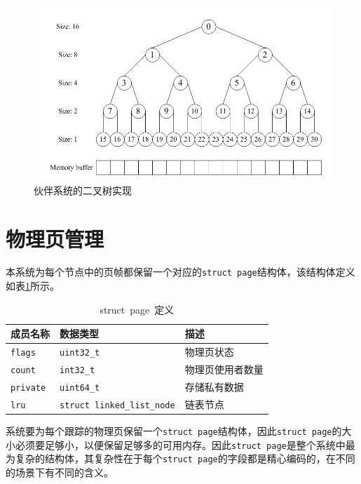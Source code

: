 \documentclass[AutoFakeBold]{LZUThesis}
\begin{document}
\begin{sloppypar}
\begin{figure}[htb]
\centering
\includegraphics[width=400pt]{images/buddy-system-binary-tree-implementation.jpg}
\caption{伙伴系统的二叉树实现}
\label{figure:buddy-system-binary-tree-implementation}
\end{figure}


\section{物理页管理}

本系统为每个节点中的页帧都保留一个对应的\texttt{struct\ page}结构体，该结构体定义如表\ref{table:struct-page-definition}所示。

\begin{longtable}[htb]{@{}lll@{}}
\caption{struct\ page\ 定义}\label{table:struct-page-definition} \\
\toprule\noalign{}
成员名称 & 数据类型 & 描述 \\
\midrule\noalign{}
\endhead
\bottomrule\noalign{}
\endlastfoot
\texttt{flags} & \texttt{uint32\_t} & 物理页状态 \\
\texttt{count} & \texttt{int32\_t} & 物理页使用者数量 \\
\texttt{private} & \texttt{uint64\_t} & 存储私有数据 \\
\texttt{lru} & \texttt{struct\ linked\_list\_node} & 链表节点 \\
\end{longtable}

系统要为每个跟踪的物理页保留一个\texttt{struct\ page}结构体，因此\texttt{struct\ page}的大小必须要足够小，以便保留足够多的可用内存。因此\texttt{struct\ page}是整个系统中最为复杂的结构体，其复杂性在于每个\texttt{struct\ page}的字段都是精心编码的，在不同的场景下有不同的含义。


\end{sloppypar}
\end{document}
